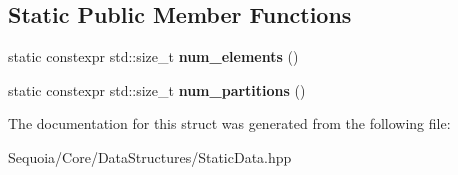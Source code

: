 \subsection*{Static Public Member Functions}
\begin{DoxyCompactItemize}
\item 
\mbox{\label{structsequoia_1_1data__structures_1_1static__contiguous__data_1_1data_a857620bca2d8a4d733ca4f287e623d44}} 
static constexpr std\+::size\+\_\+t {\bfseries num\+\_\+elements} ()
\item 
\mbox{\label{structsequoia_1_1data__structures_1_1static__contiguous__data_1_1data_a735cf22c60f2aa97ab85d4d1d08461c8}} 
static constexpr std\+::size\+\_\+t {\bfseries num\+\_\+partitions} ()
\end{DoxyCompactItemize}


The documentation for this struct was generated from the following file\+:\begin{DoxyCompactItemize}
\item 
Sequoia/\+Core/\+Data\+Structures/Static\+Data.\+hpp\end{DoxyCompactItemize}
